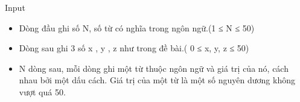 Input
 
\begin{itemize}
	\item Dòng đầu ghi số N, số từ có nghĩa trong ngôn ngữ.(1 ≤ N ≤ 50)
	\item Dòng sau ghi 3 số x , y , z như trong đề bài.( 0 ≤ x, y, z ≤ 50)
	\item N dòng sau, mỗi dòng ghi một từ thuộc ngôn ngữ và giá trị của nó, cách nhau bởi một dấu cách. Giá trị của một từ là một số nguyên dương không vượt quá 50.
\end{itemize}